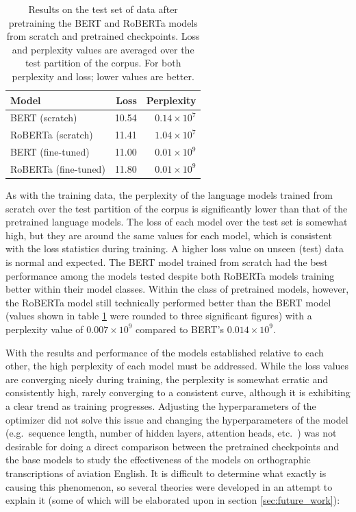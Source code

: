 \documentclass[12pt]{article}
\begin{document}
\begin{table}[h!]
    \centering
    \begin{tabular}{l r r}
        \toprule
        Model                & Loss  & Perplexity        \\
        \midrule
        BERT (scratch)       & 10.54 & $0.14\times 10^7$ \\ %
        RoBERTa (scratch)    & 11.41 & $1.04\times 10^7$ \\ %
        BERT (fine-tuned)    & 11.00 & $0.01\times 10^9$ \\ %
        RoBERTa (fine-tuned) & 11.80 & $0.01\times 10^9$ \\ %
        \bottomrule
    \end{tabular}
    \caption{Results on the test set of data after pretraining the BERT and RoBERTa models from scratch and pretrained checkpoints. Loss and
        perplexity values are averaged over the test partition of the corpus. For both perplexity and loss; lower values are better.}
    \label{tab:pretraining_results}
\end{table}

\noindent
As with the training data, the perplexity of the language models trained from scratch over the test partition of the corpus is significantly lower
than that of the pretrained language models. The loss of each model over the test set is somewhat high, but they are around the same values for each
model, which is consistent with the loss statistics during training. A higher loss value on unseen (test) data is normal and expected. The BERT model
trained from scratch had the best performance among the models tested despite both RoBERTa models training better within their model classes. Within
the class of pretrained models, however, the RoBERTa model still technically performed better than the BERT model (values shown in table
\ref{tab:pretraining_results} were rounded to three significant figures) with a perplexity value of $0.007\times 10^9$ compared to BERT's
$0.014\times 10^9$.

With the results and performance of the models established relative to each other, the high perplexity of each model must be addressed. While the loss
values are converging nicely during training, the perplexity is somewhat erratic and consistently high, rarely converging to a consistent curve,
although it is exhibiting a clear trend as training progresses. Adjusting the hyperparameters of the optimizer did not solve this issue and changing
the hyperparameters of the model (e.g.~sequence length, number of hidden layers, attention heads, etc.~) was not desirable for doing a direct
comparison between the pretrained checkpoints and the base models to study the effectiveness of the models on orthographic transcriptions of aviation
English. It is difficult to determine what exactly is causing this phenomenon, so several theories were developed in an attempt to explain it (some
of which will be elaborated upon in section \ref{sec:future_work}):
\end{document}
